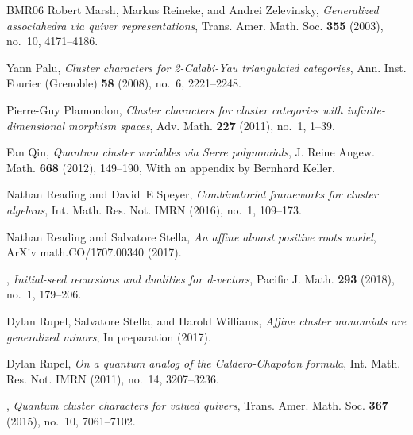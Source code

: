 \documentclass[12pt]{amsart}
\begin{document}
\begin{thebibliography}{BMR{\etalchar{+}}06}
Robert Marsh, Markus Reineke, and Andrei Zelevinsky, \emph{Generalized
  associahedra via quiver representations}, Trans. Amer. Math. Soc.
  \textbf{355} (2003), no.~10, 4171--4186. 

Yann Palu, \emph{Cluster characters for 2-{C}alabi-{Y}au triangulated
  categories}, Ann. Inst. Fourier (Grenoble) \textbf{58} (2008), no.~6,
  2221--2248. 

Pierre-Guy Plamondon, \emph{Cluster characters for cluster categories with
  infinite-dimensional morphism spaces}, Adv. Math. \textbf{227} (2011), no.~1,
  1--39. 

Fan Qin, \emph{Quantum cluster variables via {S}erre polynomials}, J. Reine
  Angew. Math. \textbf{668} (2012), 149--190, With an appendix by Bernhard
  Keller. 

Nathan Reading and David~E Speyer, \emph{Combinatorial frameworks for cluster
  algebras}, Int. Math. Res. Not. IMRN (2016), no.~1, 109--173. 

Nathan Reading and Salvatore Stella, \emph{{An affine almost positive roots
  model}}, ArXiv math.CO/1707.00340 (2017).

\bysame, \emph{Initial-seed recursions and dualities for d-vectors}, Pacific J.
  Math. \textbf{293} (2018), no.~1, 179--206. 

Dylan Rupel, Salvatore Stella, and Harold Williams, \emph{Affine cluster
  monomials are generalized minors}, In preparation (2017).

Dylan Rupel, \emph{On a quantum analog of the {C}aldero-{C}hapoton formula},
  Int. Math. Res. Not. IMRN (2011), no.~14, 3207--3236. 

\bysame, \emph{Quantum cluster characters for valued quivers}, Trans. Amer.
  Math. Soc. \textbf{367} (2015), no.~10, 7061--7102. 

\end{thebibliography}
\end{document}

